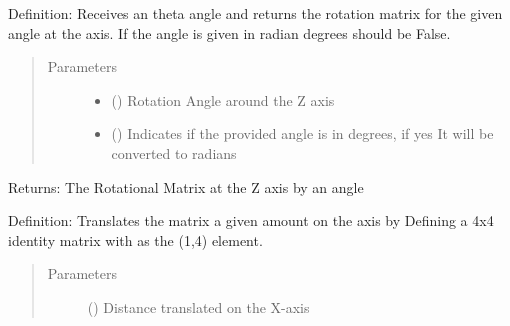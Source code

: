 \documentclass[letterpaper,10pt,english,openany,oneside]{sphinxmanual}
\begin{document}
\begin{fulllineitems}
\begin{fulllineitems}
\label{\detokenize{MatrixManipulation:MatrixManipulation.Matrix.rot_z}}
Definition: Receives an theta angle and returns the rotation matrix for the given angle at the  axis.
If the angle is given in radian degrees should be False.
\begin{quote}\begin{description}
\item[{Parameters}] \leavevmode\begin{itemize}
\item {} 
 () \textendash{} Rotation Angle around the Z axis

\item {} 
 () \textendash{} Indicates if the provided angle is in degrees, if yes It will be converted to radians

\end{itemize}

\end{description}\end{quote}

Returns: The Rotational Matrix at the Z axis by an  angle

\end{fulllineitems}


\begin{fulllineitems}
\label{\detokenize{MatrixManipulation:MatrixManipulation.Matrix.trans_x}}
Definition: Translates the matrix a given amount  on the  axis by Defining a 4x4 identity
matrix with  as the (1,4) element.
\begin{quote}\begin{description}
\item[{Parameters}] \leavevmode
{} () \textendash{} Distance translated on the X-axis


\end{description}
\end{quote}
\end{fulllineitems}
\end{fulllineitems}
\end{document}
